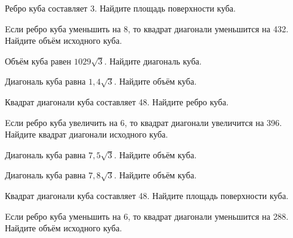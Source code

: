 \begin{taskBN}{65}
Ребро куба составляет 3. Найдите площадь поверхности куба.
\end{taskBN}

\begin{taskBN}{66}
Eсли ребро куба уменьшить на 8, то квадрат диагонали уменьшится на 432. Найдите объём исходного куба.
\end{taskBN}

\begin{taskBN}{67}
Объём куба равен $1029\sqrt{3}$. Найдите диагональ куба.
\end{taskBN}

\begin{taskBN}{68}
Диагональ куба равна $1,4\sqrt{3}$. Найдите объём куба.
\end{taskBN}

\begin{taskBN}{69}
Квадрат диагонали куба составляет 48. Найдите ребро куба.
\end{taskBN}

\begin{taskBN}{70}
Eсли ребро куба увеличить на 6, то квадрат диагонали увеличится на 396. Найдите квадрат диагонали исходного куба.
\end{taskBN}

\begin{taskBN}{71}
Диагональ куба равна $7,5\sqrt{3}$. Найдите объём куба.
\end{taskBN}

\begin{taskBN}{72}
Диагональ куба равна $7,8\sqrt{3}$. Найдите объём куба.
\end{taskBN}

\begin{taskBN}{73}
Квадрат диагонали куба составляет 48. Найдите площадь поверхности куба.
\end{taskBN}

\begin{taskBN}{74}
Eсли ребро куба уменьшить на 6, то квадрат диагонали уменьшится на 288. Найдите объём исходного куба.
\end{taskBN}

